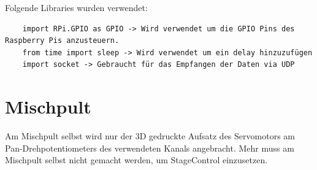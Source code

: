 Folgende Libraries wurden verwendet:

\begin{lstlisting}
	import RPi.GPIO as GPIO -> Wird verwendet um die GPIO Pins des Raspberry Pis anzusteuern.
	from time import sleep -> Wird verwendet um ein delay hinzuzufügen
	import socket -> Gebraucht für das Empfangen der Daten via UDP
\end{lstlisting}



\section{Mischpult}
Am Mischpult selbst wird nur der 3D gedruckte Aufsatz des Servomotors am Pan-Drehpotentiometers des verwendeten Kanals angebracht. Mehr muss am Mischpult selbst nicht gemacht werden, um StageControl einzusetzen.

